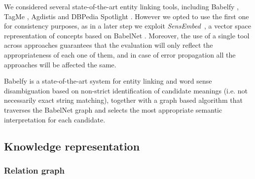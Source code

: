 %

We considered several state-of-the-art entity linking tools, including Babelfy \cite{Moroetal2014b}, TagMe \cite{Ferraginaetal2010}, Agdistis \cite{Usbecketal2014} and DBPedia Spotlight \cite{Mendes2011}. However we opted to use the first one for consistency purposes, as in a later step we exploit \textit{SensEmbed}~\cite{Iacobaccietal2015}, a vector space representation of concepts based on BabelNet \cite{Navigli2010}. Moreover, the use of a single tool across approaches guarantees that the evaluation will only reflect the appropriateness of each one of them, and in case of error propagation all the approaches will be affected the same.

Babelfy \cite{Moroetal2014b} is a state-of-the-art system for entity linking and word sense disambiguation based on non-strict identification of candidate meanings (i.e. not necessarily exact string matching), together with a graph based algorithm that traverses the BabelNet graph and selects the most appropriate semantic interpretation for each candidate.

\subsection{Knowledge representation}\label{sec:similarity:knowledge_representations}

\subsubsection{Relation graph}\label{sec:similarity:rel_graph} %

